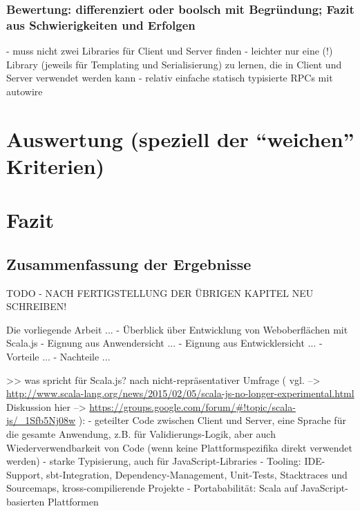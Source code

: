 \documentclass[a4paper, 12pt, listof=totoc, bibliography=totoc]{scrreprt}
\begin{document}
\subsection{Bewertung: differenziert oder boolsch mit Begründung; Fazit aus Schwierigkeiten und Erfolgen}
- muss nicht zwei Libraries für Client und Server finden
- leichter nur eine (!) Library (jeweils für Templating und Serialisierung) zu lernen, die in Client und Server verwendet werden kann
\cite{haoyi.HOS}
- relativ einfache statisch typisierte RPCs mit autowire


\chapter{Auswertung (speziell der "`weichen"' Kriterien)}


\chapter{Fazit}

\section{Zusammenfassung der Ergebnisse}

TODO - NACH FERTIGSTELLUNG DER ÜBRIGEN KAPITEL NEU SCHREIBEN!

Die vorliegende Arbeit ...
- Überblick über Entwicklung von Weboberflächen mit Scala.js
- Eignung aus Anwendersicht ...
- Eignung aus Entwicklersicht ...
- Vorteile ...
- Nachteile ...





>> was spricht für Scala.js?
    nach nicht-repräsentativer Umfrage (
      vgl.  -->  \url{http://www.scala-lang.org/news/2015/02/05/scala-js-no-longer-experimental.html}
      Diskussion hier  -->  \url{https://groups.google.com/forum/#!topic/scala-js/_1Sfb5Nj08w}
    ):
    - geteilter Code zwischen Client und Server, eine Sprache für die gesamte Anwendung, z.B. für Validierungs-Logik, aber auch Wiederverwendbarkeit von Code (wenn keine Plattformspezifika direkt verwendet werden)
    \cite{doeraene2013.CSJ}
    - starke Typisierung, auch für JavaScript-Libraries
    - Tooling: IDE-Support, sbt-Integration, Dependency-Management, Unit-Tests, Stacktraces und Sourcemaps, kross-compilierende Projekte
    - Portababilität: Scala auf JavaScript-basierten Plattformen
\end{document}
